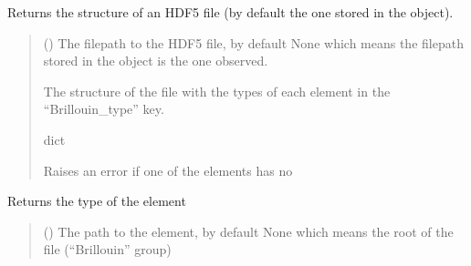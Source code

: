 \documentclass[letterpaper,10pt,english]{sphinxmanual}
\begin{document}
\begin{fulllineitems}
\begin{fulllineitems}
\label{\detokenize{_autosummary/HDF5_BLS.wrapper:HDF5_BLS.wrapper.Wrapper.get_structure}}
\pysigstartsignatures
\pysiglinewithargsret
{}
{}
{}
\pysigstopsignatures
\sphinxAtStartPar
Returns the structure of an HDF5 file (by default the one stored in the object).
\begin{quote}\begin{description}
\sphinxAtStartPar
{} (\sphinxstyleliteralemphasis{\sphinxupquote{, }}) \textendash{} The filepath to the HDF5 file, by default None which means the filepath stored in the object is the one observed.

\sphinxAtStartPar
The structure of the file with the types of each element in the “Brillouin\_type” key.

\sphinxAtStartPar
dict

\sphinxAtStartPar
{} \textendash{} Raises an error if one of the elements has no

\end{description}\end{quote}

\end{fulllineitems}


\begin{fulllineitems}
\label{\detokenize{_autosummary/HDF5_BLS.wrapper:HDF5_BLS.wrapper.Wrapper.get_type}}
\pysigstartsignatures
\pysiglinewithargsret
{}
{\sphinxparamcomma {}}
{}
\pysigstopsignatures
\sphinxAtStartPar
Returns the type of the element
\begin{quote}\begin{description}
\sphinxAtStartPar
{} (\sphinxstyleliteralemphasis{\sphinxupquote{, }}) \textendash{} The path to the element, by default None which means the root of the file (“Brillouin” group)


\end{description}
\end{quote}
\end{fulllineitems}
\end{fulllineitems}
\end{document}
